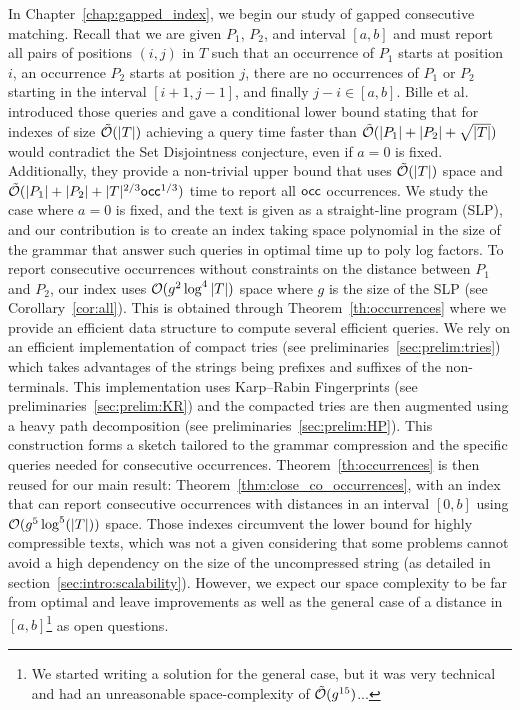 In Chapter~\ref{chap:gapped_index}, we begin our study of gapped consecutive matching. Recall that we are given $P_1$, $P_2$, and interval $[a,b]$ and must report all pairs of positions $(i,j)$ in $T$ such that an occurrence of $P_1$ starts at position $i$, an occurrence $P_2$ starts at position $j$, there are no occurrences of $P_1$ or $P_2$ starting in the interval $[i+1,j-1]$, and finally $j-i \in [a,b]$.
Bille et al.~\cite{bille2022gapped} introduced those queries and gave a conditional lower bound stating that for indexes of size $\tilde {\mathcal{O}}(|T|)$ achieving a query time faster than $\tilde {\mathcal{O}}(|P_1|+|P_2|+\sqrt{|T|})$ would contradict the Set Disjointness conjecture, even if $a=0$ is fixed. Additionally, they provide a non-trivial upper bound that uses $\tilde {\mathcal{O}}(|T|)$ space and $\tilde {\mathcal{O}} (|P_1| +|P_2| + |T|^{2/3}\mathsf{occ}^{1/3})$ time to report all $\mathsf{occ}$ occurrences. 
We study the case where $a=0$ is fixed, and the text is given as a straight-line program (SLP), and our contribution is to create an index taking space polynomial in the size of the grammar that answer such queries in optimal time up to poly log factors.
To report consecutive occurrences without constraints on the distance between $P_1$ and $P_2$, our index uses $\mathcal{O}(g^2\log^4|T|)$ space where $g$ is the size of the SLP (see Corollary~\ref{cor:all}).
This is obtained through Theorem~\ref{th:occurrences} where we provide an efficient data structure to compute several efficient queries. We rely on an efficient implementation of compact tries (see preliminaries~\ref{sec:prelim:tries}) which takes advantages of the strings being prefixes and suffixes of the non-terminals. This implementation uses Karp--Rabin Fingerprints (see preliminaries~\ref{sec:prelim:KR}) and the compacted tries are then augmented using a heavy path decomposition (see preliminaries~\ref{sec:prelim:HP}). This construction forms a sketch tailored to the grammar compression and the specific queries needed for consecutive occurrences.
Theorem~\ref{th:occurrences} is then reused for our main result: Theorem~\ref{thm:close_co_occurrences}, with an index that can report consecutive occurrences with distances in an interval $[0,b]$ using $\mathcal{O} (g^5\log^5(|T|))$ space.
Those indexes circumvent the lower bound for highly compressible texts, which was not a given considering that some problems cannot avoid a high dependency on the size of the uncompressed string (as detailed in section~\ref{sec:intro:scalability}). However, we expect our space complexity to be far from optimal and leave improvements as well as the general case of a distance in $[a,b]$\footnote{We started writing a solution for the general case, but it was very technical and had an unreasonable space-complexity of $\tilde {\mathcal{O}}(g^{15})$...} as open questions.


